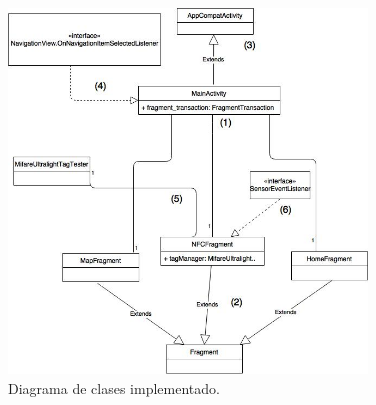 \begin{figure}[H]
	\centering
	\includegraphics[width=0.85\textwidth]{imagenes/diagrama.jpg}
	\caption{Diagrama de clases implementado.}
\end{figure}

